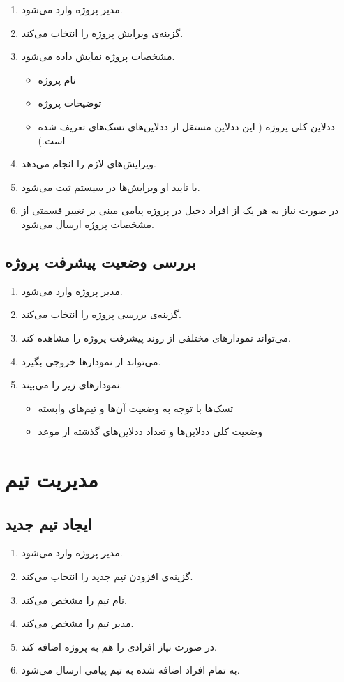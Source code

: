 \documentclass[10pt,a4paper]{article}
\begin{document}
\begin{enumerate}
	\item 
	مدیر پروژه وارد می‌شود.
	\item
	گزینه‌ی ویرایش پروژه‌ را انتخاب می‌کند.
	\item
	 مشخصات پروژه نمایش داده می‌شود.
	 \begin{itemize}
	 	\item 
	 	نام پروژه
	 	\item
	 	توضیحات پروژه
	 	\item
	 	ددلاین کلی پروژه ( این ددلاین مستقل از ددلاین‌های تسک‌های تعریف شده است.)
	 \end{itemize}
 \item
 ویرایش‌های لازم را انجام می‌دهد.
 \item
 با تایید او ویرایش‌ها در سیستم ثبت می‌شود.
 \item
 در صورت نیاز به هر یک از افراد دخیل در پروژه پیامی مبنی بر تغییر قسمتی از مشخصات پروژه ارسال می‌شود.
\end{enumerate}

\subsection{
بررسی وضعیت پیشرفت پروژه
}


\begin{enumerate}
	\item 
	مدیر پروژه وارد می‌شود.
	\item
	گزینه‌ی بررسی پروژه را انتخاب می‌کند.
	\item
	می‌تواند نمودار‌های مختلفی از روند پیشرفت پروژه را مشاهده کند.
	\item
	می‌تواند از نمودار‌ها خروجی بگیرد.
	\item
	نمودارهای زیر را می‌بیند.
		 \begin{itemize}
		\item 
		تسک‌ها با توجه به وضعیت آن‌ها و تیم‌های وابسته
		\item
		وضعیت کلی ددلاین‌ها و تعداد ددلاین‌های گذشته از موعد
	\end{itemize}
	
\end{enumerate}


\section{
مدیریت تیم
}

\subsection{
ایجاد تیم جدید
}
\begin{enumerate}
	\item 
	مدیر پروژه وارد می‌شود.
	\item
	گزینه‌ی افزودن تیم جدید را انتخاب می‌کند.
	\item
	نام تیم را مشخص می‌کند.
	\item
	مدیر تیم را مشخص می‌کند.
	\item
	در صورت نیاز افرادی را هم به پروژه اضافه کند.
	\item
	به تمام افراد اضافه شده به تیم پیامی ارسال می‌شود.
\end{enumerate}
\end{document}
